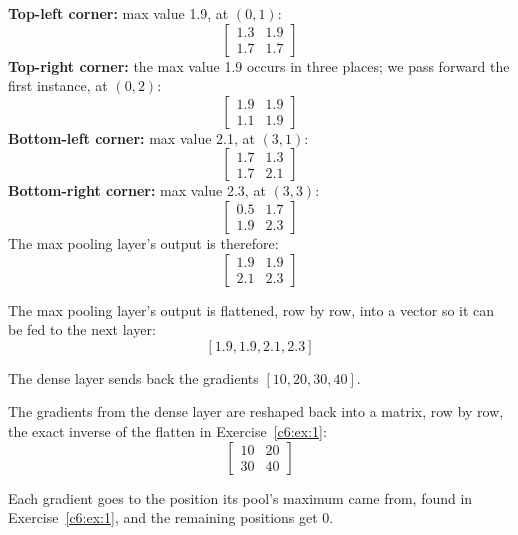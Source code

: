 \textbf{Top-left corner:} max value 1.9, at $(0, 1)$:
\[
  \begin{bmatrix} 1.3 & 1.9 \\ 1.7 & 1.7 \end{bmatrix}
\]
\textbf{Top-right corner:} the max value 1.9 occurs in three places; we pass forward the first
instance, at $(0, 2)$:
\[
  \begin{bmatrix} 1.9 & 1.9 \\ 1.1 & 1.9 \end{bmatrix}
\]
\textbf{Bottom-left corner:} max value 2.1, at $(3, 1)$:
\[
  \begin{bmatrix} 1.7 & 1.3 \\ 1.7 & 2.1 \end{bmatrix}
\]
\textbf{Bottom-right corner:} max value 2.3, at $(3, 3)$:
\[
  \begin{bmatrix} 0.5 & 1.7 \\ 1.9 & 2.3 \end{bmatrix}
\]
The max pooling layer's output is therefore:
\[
  \begin{bmatrix} 1.9 & 1.9 \\ 2.1 & 2.3 \end{bmatrix}
\]

The max pooling layer's output is flattened, row by row, into a vector so it can be fed to the next
layer:
\[
  [1.9, 1.9, 2.1, 2.3]
\]

The dense layer sends back the gradients $[10, 20, 30, 40]$.

The gradients from the dense layer are reshaped back into a matrix, row by row, the exact inverse
of the flatten in Exercise~\ref{c6:ex:1}:
\[
  \begin{bmatrix} 10 & 20 \\ 30 & 40 \end{bmatrix}
\]

Each gradient goes to the position its pool's maximum came from, found in
Exercise~\ref{c6:ex:1}, and the remaining positions get 0.

